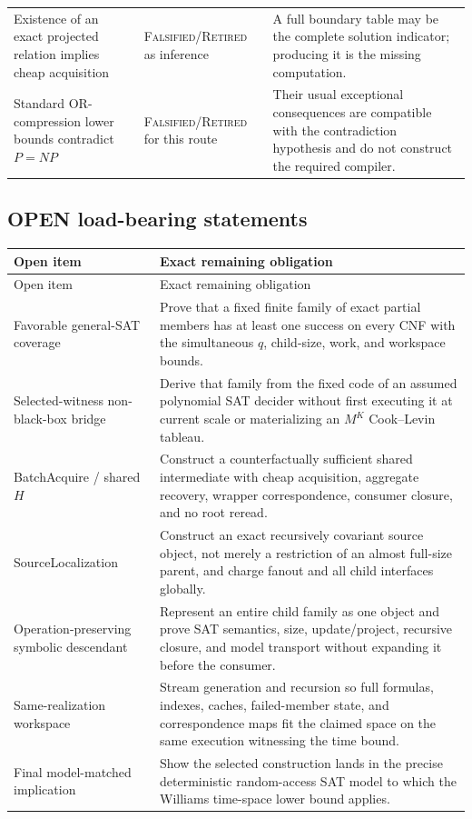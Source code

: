 \documentclass[10pt]{article}
\newcommand{\Falsified}{\textsc{Falsified/Retired}}
\begin{document}
\begin{longtable}{L{0.25\textwidth}L{0.20\textwidth}L{0.48\textwidth}}
Existence of an exact projected relation implies cheap acquisition &
\Falsified{} as inference & A full boundary table may be the complete solution
indicator; producing it is the missing computation. \\

Standard OR-compression lower bounds contradict $P=NP$ & \Falsified{} for
this route & Their usual exceptional consequences are compatible with the
contradiction hypothesis and do not construct the required compiler. \\

\end{longtable}
\normalsize

\subsection*{OPEN load-bearing statements}
\small
\begin{longtable}{L{0.27\textwidth}L{0.66\textwidth}}
\toprule
Open item & Exact remaining obligation \\
\midrule
\endfirsthead
\toprule
Open item & Exact remaining obligation \\
\midrule
\endhead
\bottomrule
\endfoot

Favorable general-SAT coverage & Prove that a fixed finite family of exact
partial members has at least one success on every CNF with the simultaneous
$q$, child-size, work, and workspace bounds. \\

Selected-witness non-black-box bridge & Derive that family from the fixed code
of an assumed polynomial SAT decider without first executing it at current
scale or materializing an $M^K$ Cook--Levin tableau. \\

BatchAcquire / shared $H$ & Construct a counterfactually sufficient shared
intermediate with cheap acquisition, aggregate recovery, wrapper
correspondence, consumer closure, and no root reread. \\

SourceLocalization & Construct an exact recursively covariant source object,
not merely a restriction of an almost full-size parent, and charge fanout and
all child interfaces globally. \\

Operation-preserving symbolic descendant & Represent an entire child family
as one object and prove SAT semantics, size, update/project, recursive closure,
and model transport without expanding it before the consumer. \\

Same-realization workspace & Stream generation and recursion so full formulas,
indexes, caches, failed-member state, and correspondence maps fit the claimed
space on the same execution witnessing the time bound. \\

Final model-matched implication & Show the selected construction lands in the
precise deterministic random-access SAT model to which the Williams
time-space lower bound applies. \\

\end{longtable}
\end{document}
